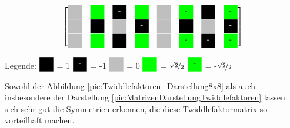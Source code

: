 \begin{minipage}{0.9\textwidth}
\begin{center}
\[{\begin{bmatrix}
     \myboxZero 	& \myboxSqrtPos 	& \myboxOneNeg 	& \myboxSqrtPos		& \myboxZero 	& \myboxSqrtNeg 	& \myboxOnePos 	& \myboxSqrtNeg \\
     \myboxZero 	& \myboxOnePos 		& \myboxZero 	& \myboxOneNeg 		& \myboxZero 	& \myboxOnePos 		& \myboxZero 	& \myboxOneNeg \\
     \myboxZero 	& \myboxSqrtPos 	& \myboxOnePos 	& \myboxSqrtPos		& \myboxZero	& \myboxSqrtNeg		& \myboxOneNeg	& \myboxSqrtNeg 
    \end{bmatrix}
   }
  \]
  \label{pic:MatrizenDarstellungTwiddlefaktoren}
 
\vspace{0.5cm}
  Legende: $\myboxOnePos$ = 1 \quad $\myboxOneNeg$ = -1 \quad $\myboxZero$ = 0 \quad $\myboxSqrtPos$ = $\nicefrac{\sqrt{2}}{2}$ \quad $\myboxSqrtNeg$ = -$\nicefrac{\sqrt{2}}{2}$
\end{center}
\endgroup
\end{minipage}


\vspace{0.5cm}


Sowohl der Abbildung \ref{pic:Twiddlefaktoren_Darstellung8x8} als auch insbesondere der Darstellung \ref{pic:MatrizenDarstellungTwiddlefaktoren} lassen sich sehr gut die 
Symmetrien erkennen, die diese Twiddlefaktormatrix so vorteilhaft machen.